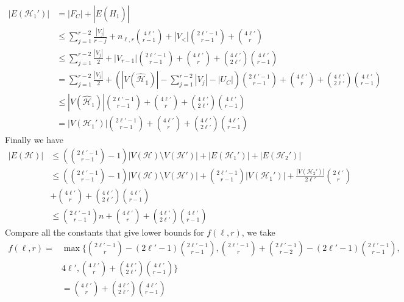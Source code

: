 \documentclass[12pt]{article}%
\newcommand{\mh}{\mathcal{H}}
\begin{document}
\begin{equation*}
\begin{aligned}
    |E(\mh_{1}')|&=|F_{C}|+|E(\hat{H}_{1})|\\
    &\leq \sum_{j=1}^{r-2}\frac{|V_{j}|}{r-j}+n_{\ell,r}\binom{4\ell'}{r-1}+|V_{<}|\binom{2\ell'-1}{r-1}+\binom{4\ell'}{r}\\
    &\leq \sum_{j=1}^{r-2}\frac{|V_{j}|}{2}+|V_{r-1}|\binom{2\ell'-1}{r-1}+\binom{4\ell'}{r}+\binom{4\ell'}{2\ell'}\binom{4\ell'}{r-1}\\
    &= \sum_{j=1}^{r-2}\frac{|V_{j}|}{2}+\left(|V(\hat{\mh}_{1})|-\sum_{j=1}^{r-2}|V_{j}|-|U_{C}|\right)\binom{2\ell'-1}{r-1}+\binom{4\ell'}{r}+\binom{4\ell'}{2\ell'}\binom{4\ell'}{r-1}\\
    &\leq |V(\hat{\mh}_{1})|\binom{2\ell'-1}{r-1}+\binom{4\ell'}{r}+\binom{4\ell'}{2\ell'}\binom{4\ell'}{r-1}\\
    &=|V(\mh_{1}')|\binom{2\ell'-1}{r-1}+\binom{4\ell'}{r}+\binom{4\ell'}{2\ell'}\binom{4\ell'}{r-1}
\end{aligned}
\end{equation*}
Finally we have
\begin{equation*}
    \begin{aligned}
        |E(\mh)|&\leq\left(\binom{2\ell'-1}{r-1}-1\right)|V(\mh)\setminus V(\mh')|+|E(\mh_{1}')|+|E(\mh_{2}')|\\
        &\leq \left(\binom{2\ell'-1}{r-1}-1\right)|V(\mh)\setminus V(\mh')|+\binom{2\ell'-1}{r-1}|V(\mh_{1}')|+\frac{|V(\mh_{2}')|}{2\ell'}\binom{2\ell'}{r} \\
        &+\binom{4\ell'}{r}+\binom{4\ell'}{2\ell'}\binom{4\ell'}{r-1}\\
        &\leq \binom{2\ell'-1}{r-1}n+\binom{4\ell'}{r}+\binom{4\ell'}{2\ell'}\binom{4\ell'}{r-1}
    \end{aligned}
\end{equation*}
Compare all the constants that give lower bounds for $f(\ell,r)$, we take
\begin{equation*}
    \begin{aligned}
        f(\ell,r)=&\max\{\binom{2\ell'-1}{r}-(2\ell'-1)\binom{2\ell'-1}{r-1},\binom{2\ell'-1}{r}+\binom{2\ell'-1}{r-2}-(2\ell'-1)\binom{2\ell'-1}{r-1},\\
        &4\ell',\binom{4\ell'}{r}+\binom{4\ell'}{2\ell'}\binom{4\ell'}{r-1}\}\\
        &=\binom{4\ell'}{r}+\binom{4\ell'}{2\ell'}\binom{4\ell'}{r-1}
    \end{aligned}
\end{equation*}
\end{document}
